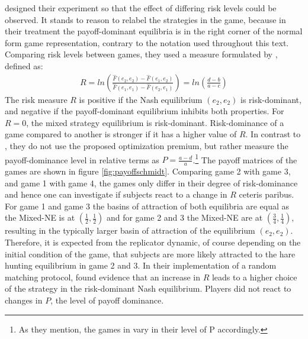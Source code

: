 \textcite{schmidt_playing_2003} designed their experiment so that the effect
of differing risk levels could be observed. It stands to reason to relabel 
the strategies in the game, because in their treatment the payoff-dominant 
equilibria is in the right corner of the normal form game representation,
contrary to the notation used throughout this text. Comparing risk levels between
games, they used a measure formulated by \textcite{selten_axiomatic_1995}, 
defined
as:
\begin{align}
        \label{riskmeasureschmidt}
        R = ln\left(\frac{\hat{F}(e_2,e_2) -\hat{F}(e_1,e_2)}{\hat{F}(e_1,e_1) 
        -\hat{F}(e_2,e_1)}\right) = ln \left(\frac{d-b}{a-c}\right)
\end{align}
The risk measure $R$ is positive if the Nash equilibrium $(e_2,e_2)$ is
risk-dominant, and negative if the payoff-dominant equilibrium inhibits both
properties. For $R=0$, the mixed strategy equilibrium is risk-dominant.
Risk-dominance of a game compared to another is stronger 
if it has a higher value of $R$.
In contrast to \textcite{battalio_optimization_2001}, they do not
use the proposed optimization premium, but rather measure the 
payoff-dominance level in relative terms 
as $P=\frac{a-d}{a}$.\footnote{As they mention, the 
games in \textcite{battalio_optimization_2001} vary in their level of 
P accordingly.}
The payoff matrices of the games are shown in figure \ref{fig:payoffschmidt}.
Comparing game 2 with game 3, and game 1 with game 4, the games
only differ in their degree of risk-dominance and hence one can 
investigate if subjects react to a change in $R$ ceteris paribus. 
For game 1 and game 3 the basins of attraction of both equilibria are equal as
the Mixed-NE is at $(\frac 12, \frac 12)$ and  for
game 2 and 3 the Mixed-NE are at $(\frac 34,\frac 14)$, resulting in the 
typically larger basin of attraction of the equilibrium $(e_2,e_2)$. 
Therefore, it is expected from the replicator dynamic, of course 
depending on the initial condition 
of the game, that subjects are more likely attracted to the hare hunting 
equilibrium in game 2 and 3. In their implementation of a 
random matching protocol, \textcite{schmidt_playing_2003} 
found evidence that an increase in $R$ leads to a higher choice 
of the strategy in the risk-dominant Nash equilibrium. Players did not react 
to changes in $P$, the level of payoff dominance.

